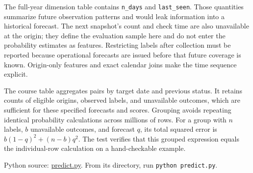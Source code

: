 \noindent \noindent The full-year dimension table contains \texttt{n\_days} and
\texttt{last\_seen}. Those quantities summarize future observation
patterns and would leak information into a historical forecast. The next
snapshot's count and check time are also unavailable at the origin; they
define the evaluation sample here and do not enter the probability
estimates as features. Restricting labels after collection must be
reported because operational forecasts are issued before that future
coverage is known. Origin-only features and exact calendar joins make
the time sequence explicit.

The course table aggregates pairs by target date and previous status. It
retains counts of eligible origins, observed labels, and unavailable
outcomes, which are sufficient for these specified forecasts and scores.
Grouping avoids repeating identical probability calculations across
millions of rows. For a group with \(n\) labels, \(b\) unavailable
outcomes, and forecast \(q\), its total squared error is
\(b(1-q)^2+(n-b)q^2\). The test verifies that this grouped expression
equals the individual-row calculation on a hand-checkable example.

\FloatBarrier
{}
Python source:
\href{../03_Data_and_Code/McBroken/predict.py}{predict.py}. From its
directory, run \texttt{python\ predict.py}.

